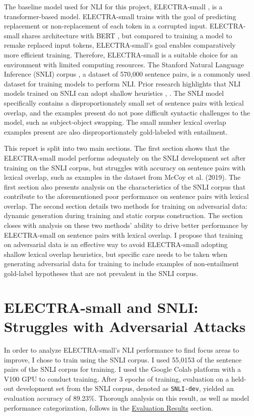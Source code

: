 \documentclass[11pt,a4paper]{article}
\begin{document}
The baseline model used for NLI for this project, ELECTRA-small \cite{DBLP:journals/corr/abs-2003-10555}, is a transformer-based model. ELECTRA-small trains with the goal of predicting replacement or non-replacement of each token in a corrupted input. ELECTRA-small shares architecture with BERT \cite{DBLP:journals/corr/abs-1810-04805}, but compared to training a model to remake replaced input tokens, ELECTRA-small's goal enables comparatively more efficient training. Therefore, ELECTRA-small is a suitable choice for an environment with limited computing resources. The Stanford Natural Language Inference (SNLI) corpus \cite{bowman-etal-2015-large}, a dataset of 570,000 sentence pairs, is a commonly used dataset for training models to perform NLI. Prior research highlights that NLI models trained on SNLI can adopt shallow heuristics \cite{gururangan-etal-2018-annotation}, \cite{DBLP:journals/corr/abs-2201-07614}. The SNLI model specifically contains a disproportionately small set of sentence pairs with lexical overlap, and the examples present do not pose difficult syntactic challenges to the model, such as subject-object swapping. The small number lexical overlap examples present are also disproportionately gold-labeled with entailment.

This report is split into two main sections. The first section shows that the ELECTRA-small model performs adequately on the SNLI development set after training on the SNLI corpus, but struggles with accuracy on sentence pairs with lexical overlap, such as examples in the dataset from McCoy et al. (2019). The first section also presents analysis on the characteristics of the SNLI corpus that contribute to the aforementioned poor performance on sentence pairs with lexical overlap. The second section details two methods for training on adversarial data: dynamic generation during training and static corpus construction. The section closes with analysis on these two methods' ability to drive better performance by ELECTRA-small on sentence pairs with lexical overlap. I propose that training on adversarial data is an effective way to avoid ELECTRA-small adopting shallow lexical overlap heuristics, but specific care needs to be taken when generating adversarial data for training to include examples of non-entailment gold-label hypotheses that are not prevalent in the SNLI corpus.

\section{ELECTRA-small and SNLI: Struggles with Adversarial Attacks}
In order to analyze ELECTRA-small's NLI performance to find focus areas to improve, I chose to train using the SNLI corpus. I used 55,0153 of the sentence pairs of the SNLI corpus for training. I used the Google Colab platform with a V100 GPU to conduct training. After 3 epochs of training, evaluation on a held-out development set from the SNLI corpus, denoted as \texttt{SNLI-dev}, yielded an evaluation accuracy of 89.23\%. Thorough analysis on this result, as well as model performance categorization, follows in the \hyperref[sec:evaluation]{Evaluation Results} section.
\end{document}
